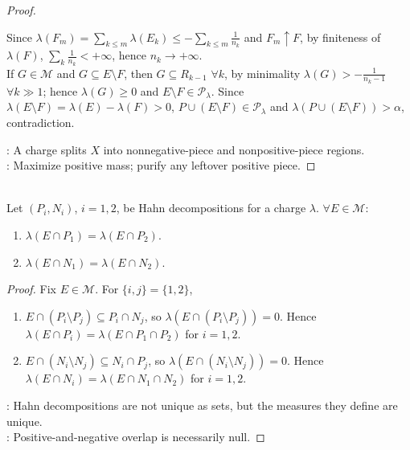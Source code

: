 \begin{theorem}
\begin{proof}
\begin{enumerate}[label=(\roman*)]
Since $\lambda(F_m)=\sum\limits_{k\leq m}\lambda(E_k)\leq-\sum\limits_{k\leq m}\frac{1}{n_k}$ and $F_m\uparrow F$, by finiteness of $\lambda(F)$, $\sum\limits_k\frac{1}{n_k}<+\infty$, hence $n_k\to+\infty$.\\
If $G\in\mathcal{M}$ and $G\subseteq E\setminus F$, then $G\subseteq R_{k-1}$ $\forall k$, by minimality $\lambda(G)>-\frac{1}{n_k-1}$ $\forall k\gg1$; hence $\lambda(G)\geq0$ and $E\setminus F\in\mathcal{P}_\lambda$. Since $\lambda(E\setminus F)=\lambda(E)-\lambda(F)>0$, $P\cup(E\setminus F)\in\mathcal{P}_\lambda$ and $\lambda(P\cup(E\setminus F))>\alpha$, contradiction.
\end{enumerate}
: A charge splits $X$ into nonnegative-piece and nonpositive-piece regions.\\
: Maximize positive mass; purify any leftover positive piece.
\end{proof}
\end{theorem}

\begin{lemma} \label{lem:hahn-positive-part-independent} \\
Let $(P_i,N_i)$, $i=1,2$, be Hahn decompositions for a charge $\lambda$. $\forall E\in\mathcal{M}$:
\begin{enumerate}[label=(\roman*)]
\setlength{\itemsep}{0pt}
\item $\lambda(E\cap P_1)=\lambda(E\cap P_2)$.
\item $\lambda(E\cap N_1)=\lambda(E\cap N_2)$.
\end{enumerate}
\begin{proof} Fix $E\in\mathcal{M}$. For $\{i,j\}=\{1,2\}$,
\begin{enumerate}[label=(\roman*)]
\setlength{\itemsep}{0pt}
\item $E\cap(P_i\setminus P_j)\subseteq P_i\cap N_j$, so $\lambda(E\cap(P_i\setminus P_j))=0$. Hence $\lambda(E\cap P_i)=\lambda(E\cap P_1\cap P_2)$ for $i=1,2$.
\item $E\cap(N_i\setminus N_j)\subseteq N_i\cap P_j$, so $\lambda(E\cap(N_i\setminus N_j))=0$. Hence $\lambda(E\cap N_i)=\lambda(E\cap N_1\cap N_2)$ for $i=1,2$.
\end{enumerate}
: Hahn decompositions are not unique as sets, but the measures they define are unique.\\
: Positive-and-negative overlap is necessarily null.
\end{proof}
\end{lemma}

